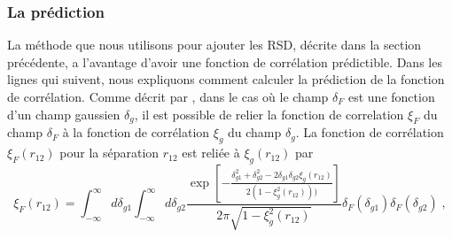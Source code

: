\subsubsection{La prédiction}
\label{subsubsec:pred}

La méthode que nous utilisons pour ajouter les RSD, décrite dans la section précédente, a l'avantage d'avoir une fonction de corrélation prédictible. %
Dans les lignes qui suivent, nous expliquons comment calculer la prédiction de la fonction de corrélation. Comme décrit par \textcite{Font-Ribera2012}, dans le cas où le champ $\delta_F$ est une fonction d'un champ gaussien $\delta_g$, il est possible de relier la fonction de correlation $\xi_F$ du champ $\delta_F$ à la fonction de corrélation $\xi_g$ du champ $\delta_g$. La fonction de corrélation $\xi_F(r_{12})$ pour la séparation $r_{12}$ est reliée à $\xi_g(r_{12})$ par
\begin{equation}
  \label{eq:xig2xif}
  \xi_F(r_{12}) = \int_{- \infty}^{\infty} d\delta_{g1} \int_{- \infty}^{\infty} d\delta_{g2}
  \frac{
    \exp\left[-
      \frac{
        \delta_{g1}^2 + \delta_{g2}^2 - 2 \delta_{g1} \delta_{g2} \xi_g(r_{12})
      }{
        2 ( 1 - \xi_g^2(r_{12})))
      }\right]
  }{
    2 \pi \sqrt{1 - \xi_g^2(r_{12})}
  }
  \delta_F(\delta_{g1})\delta_F(\delta_{g2})
  \; ,
\end{equation}
